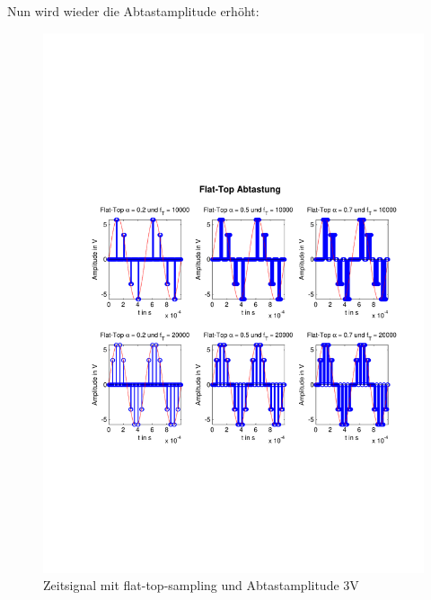   	    
  	    Nun wird wieder die Abtastamplitude erhöht:
  	    
  	    
  	    \begin{figure}[H]
    \centering
        \includegraphics[scale=0.7, trim = 0cm 0cm 0cm 0cm,
        clip]{./Bilder/flat-top-zeit_3V}
            \caption{Zeitsignal mit flat-top-sampling und Abtastamplitude 3V}
  	    \end{figure}
  	    

